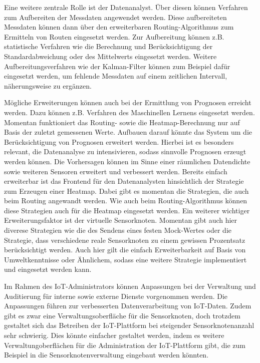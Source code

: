 Eine weitere zentrale Rolle ist der Datenanalyst. Über diesen können Verfahren zum Aufbereiten der Messdaten angewendet werden. Diese aufbereiteten Messdaten können dann über den erweiterbaren Routing-Algorithmus zum Ermitteln von Routen eingesetzt werden. Zur Aufbereitung können z.B. statistische Verfahren wie die Berechnung und Berücksichtigung der Standardabweichung oder des Mittelwerts eingesetzt werden. Weitere Aufbereitungsverfahren wie der Kalman-Filter können zum Beispiel dafür eingesetzt werden, um fehlende Messdaten auf einem zeitlichen Intervall, näherungsweise zu ergänzen.  
 

Mögliche Erweiterungen können auch bei der Ermittlung von Prognosen erreicht werden. Dazu können z.B. Verfahren des Maschinellen Lernens eingesetzt werden.
Momentan funktioniert das Routing- sowie die Heatmap-Berechnung nur auf Basis der zuletzt gemessenen Werte.
Aufbauen darauf könnte das System um die Berücksichtigung von Prognosen erweitert werden.
Hierbei ist es besonders relevant, die Datenanalyse zu intensivieren, sodass sinnvolle Prognosen erzeugt werden können.
Die Vorhersagen können im Sinne einer räumlichen Datendichte sowie weiteren Sensoren erweitert und verbessert werden. 
Bereits einfach erweiterbar ist das Frontend für den Datenanalysten hinsichtlich der Strategie zum Erzeugen einer Heatmap. 
Dabei gibt es momentan die Strategien, die auch beim Routing angewandt werden. 
Wie auch beim Routing-Algorithmus können diese Strategien auch für die Heatmap eingesetzt werden.
Ein weiterer wichtiger Erweiterungsfaktor ist der virtuelle Sensorknoten. Momentan gibt auch hier diverese Strategien wie die des Sendens eines festen Mock-Wertes oder die Strategie, dass verschiedene reale Sensorknoten zu einem gewissen Prozentsatz berücksichtigt werden. 
Auch hier gilt die einfach Erweiterbarkeit auf Basis von Umweltkenntnisse oder Ähnlichem, sodass eine weitere Strategie implementiert und eingesetzt werden kann.


Im Rahmen des IoT-Administrators können Anpassungen bei der Verwaltung und Auditierung für interne sowie externe Dienste vorgenommen werden. 
Die Anpassungen führen zur verbesserten Datenverarbeitung von IoT-Daten.
Zudem gibt es zwar eine Verwaltungsoberfläche für die Sensorknoten, doch trotzdem gestaltet sich das Betreiben der IoT-Plattform bei steigender Sensorknotenanzahl sehr schwierig. 
Dies könnte einfacher gestaltet werden, indem es weitere Verwaltungoberflächen für die Administration der IoT-Plattform gibt, die zum Beispiel in die Sensorknotenverwaltung eingebaut werden könnten.



